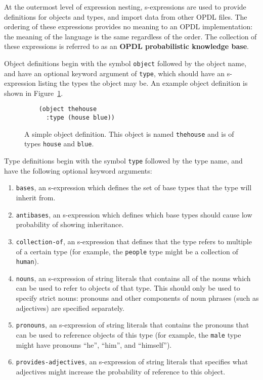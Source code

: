 \documentclass[12pt]{article}
\begin{document}
At the outermost level of expression nesting, s-expressions are used to
provide definitions for objects and types, and import data from other OPDL
files. The ordering of these expressions provides no meaning to an OPDL
implementation: the meaning of the language is the same regardless of the
order. The collection of these expressions is referred to as an \textbf{OPDL
probabilistic knowledge base}.

Object definitions begin with the symbol \texttt{object} followed by the object
name, and have an optional keyword argument of \texttt{type}, which should have
an s-expression listing the types the object may be. An example object
definition is shown in Figure~\ref{opdl:object}.

\begin{figure}[ht]
    \begin{lstlisting}
    (object thehouse
      :type (house blue))
    \end{lstlisting}
    \caption{A simple object definition. This object is named \texttt{thehouse}
    and is of types \texttt{house} and \texttt{blue}.}
    \label{opdl:object}
\end{figure}

Type definitions begin with the symbol \texttt{type} followed by the type name,
and have the following optional keyword arguments:
\begin{enumerate}
    \item \texttt{bases}, an s-expression which defines the set of base types
        that the type will inherit from.
    \item \texttt{antibases}, an s-expression which defines which base types
        should cause low probability of showing inheritance.
    \item \texttt{collection-of}, an s-expression that defines that the type
        refers to multiple of a certain type (for example, the \texttt{people}
        type might be a collection of \texttt{human}).
    \item \texttt{nouns}, an s-expression of string literals that contains all
        of the nouns which can be used to refer to objects of that type. This
        should only be used to specify strict nouns: pronouns and other
        components of noun phrases (such as adjectives) are specified
        separately.
    \item \texttt{pronouns}, an s-expression of string literals that contains
        the pronouns that can be used to reference objects of this type (for
        example, the \texttt{male} type might have pronouns ``he'', ``him'',
        and ``himself'').
    \item \texttt{provides-adjectives}, an s-expression of string literals that
        specifies what adjectives might increase the probability of reference
        to this object.
\end{enumerate}
\end{document}
